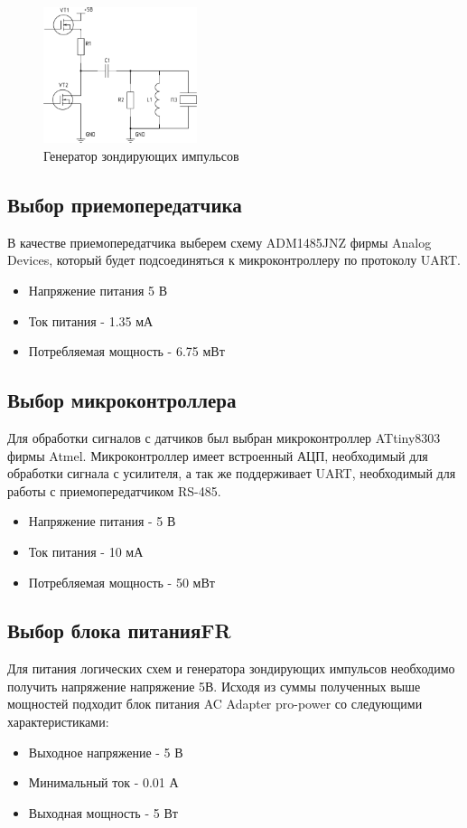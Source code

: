 \documentclass[russian, utf8, 12pt]{eskdtext}
\begin{document}
\begin{figure}[h!]
	\begin{center}
	\includegraphics[width = 0.4\textwidth] {Generator.pdf}
	\end{center}
	\caption{Генератор зондирующих импульсов}
\end{figure} 


\subsection{Выбор приемопередатчика}
В качестве приемопередатчика выберем схему ADM1485JNZ фирмы Analog Devices, который будет подсоединяться к микроконтроллеру по протоколу UART.

\begin{itemize}
	\item Напряжение питания 5 В
	\item Ток питания - 1.35 мА
	\item Потребляемая мощность - 6.75 мВт
\end{itemize}
\subsection{Выбор микроконтроллера}
Для обработки сигналов с датчиков был выбран микроконтроллер ATtiny8303 фирмы Atmel. Микроконтроллер имеет встроенный АЦП, необходимый для обработки сигнала с усилителя, а так же поддерживает UART, необходимый для работы с приемопередатчиком RS-485.
\begin{itemize}
\item Напряжение питания - 5 В
\item Ток питания - 10 мА
\item Потребляемая мощность - 50 мВт
\end{itemize}
\subsection{Выбор блока питанияFR}
Для питания логических схем и генератора зондирующих импульсов необходимо получить напряжение напряжение 5В. Исходя из суммы полученных выше мощностей подходит блок питания AC Adapter pro-power со следующими характеристиками:
\begin{itemize}
\item Выходное напряжение - 5 В
\item Минимальный ток - 0.01 А
\item Выходная мощность - 5 Вт
\end{itemize}
\end{document}
